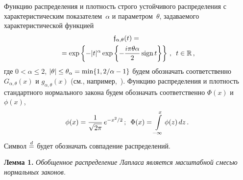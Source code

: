 \begin{multicols}{2}
Функцию распределения и плотность строго устойчивого распределения с
характеристическим показателем~$\alpha$ и параметром~$\theta$,
задаваемого характеристической функцией
\begin{multline}
\mathfrak{f}_{\alpha,\theta}(t)={}\\
{}=\exp\left\{-|t|^{\alpha}\exp\left\{
-\displaystyle\frac{\displaystyle i\pi\theta\alpha\mathstrut}{\displaystyle 2\mathstrut}\,\mathrm{sign}\,t\right\}\right\}\,,\enskip 
t\in\mathbb{R}\,,\label{e2-kor}
\end{multline}
где $0<\alpha\le2$,
$|\theta|\le\theta_{\alpha}\hm=\min\{1,{2}/{\alpha}-1\}$ будем
обозначать соответственно $G_{\alpha,\theta}(x)$ и
$g_{\alpha,\theta}(x)$ (см., например,~\cite{Zolotarev1983}).
Функцию распределения и плотность стандартного нормального закона
будем обозначать соответственно $\Phi(x)$ и~$\phi(x)$,
$$
\phi(x)=\displaystyle\frac{\displaystyle 1\mathstrut}{\displaystyle \sqrt{2\pi}\mathstrut}\,e^{-x^2/2}\,;\enskip
\Phi(x)=\int\limits_{-\infty}^x\phi(z)\,dz\,.
$$
Символ $\stackrel{d}{=}$ будет обозначать совпадение распределений.

\smallskip

\noindent
\textbf{Лемма 1.} \textit{Обобщенное распределение Лапласа является
масштабной смесью нормальных законов.}

\smallskip


\end{multicols}

